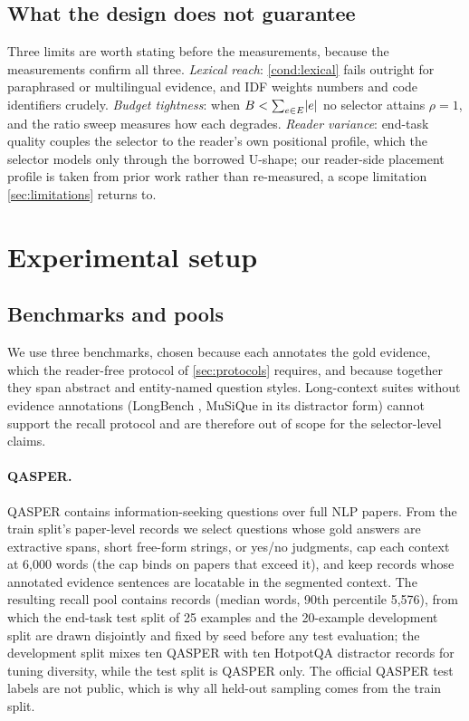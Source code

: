 \documentclass[preprint,12pt]{elsarticle}
\DeclarePairedDelimiter\abs{\lvert}{\rvert}
\theoremstyle{remark}
\begin{document}
\subsection{What the design does not guarantee}
Three limits are worth stating before the measurements, because the
measurements confirm all three. \emph{Lexical reach}:
\autoref{cond:lexical} fails outright for paraphrased or multilingual
evidence, and IDF weights numbers and code identifiers crudely.
\emph{Budget tightness}: when
$B < \sum_{e \in E} \abs{e}$ no selector attains $\rho = 1$, and the
ratio sweep measures how each degrades. \emph{Reader variance}:
end-task quality couples the selector to the reader's own positional
profile, which the selector models only through the borrowed U-shape;
our reader-side placement profile is taken from prior work rather than
re-measured, a scope limitation \autoref{sec:limitations} returns to.

\section{Experimental setup}
\label{sec:exp}

\subsection{Benchmarks and pools}
\label{sec:pools}
We use three benchmarks, chosen because each annotates the gold
evidence, which the reader-free protocol of \autoref{sec:protocols}
requires, and because together they span abstract and entity-named
question styles. Long-context suites without evidence annotations
(LongBench \citep{bai2023longbench}, MuSiQue \citep{trivedi2022musique}
in its distractor form) cannot support the recall protocol and are
therefore out of scope for the selector-level claims.

\paragraph{QASPER.}
QASPER \citep{dasigi2021qasper} contains information-seeking questions
over full NLP papers. From the train split's paper-level records we
select questions whose gold answers are extractive spans, short
free-form strings, or yes/no judgments, cap each context at 6{,}000
words (the cap binds on papers that exceed it), and keep records whose
annotated evidence sentences are locatable in the segmented context.
The resulting recall pool contains \NRecQ{} records (median
\PoolQMedWords{} words, 90th percentile 5{,}576), from which the
end-task test split of 25 examples and the 20-example development
split are drawn disjointly and fixed by seed before any test
evaluation; the development split mixes ten QASPER with ten HotpotQA
distractor records for tuning diversity, while the test split is
QASPER only. The official QASPER test labels are not public, which is
why all held-out sampling comes from the train split.
\end{document}
